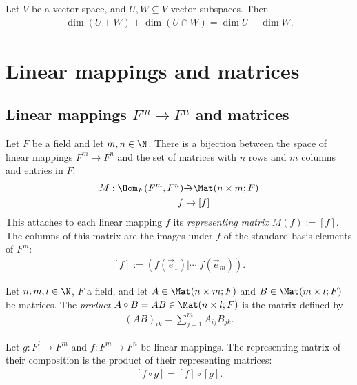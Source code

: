 \documentclass{article}
\begin{document}
\begin{corollary}
    Let $V$ be a vector space, and $U,W\subseteq V$ vector subspaces. Then
    \begin{align*}
        \dim(U+W)+\dim(U\cap W) = \dim U + \dim W.
    \end{align*}
\end{corollary}

\section{Linear mappings and matrices}

\subsection{Linear mappings $F^m\to F^n$ and matrices}

\begin{theorem}[Notes 2.1.1]
    Let $F$ be a field and let $m,n\in\N$. There is a bijection between the space of
    linear mappings $F^m\to F^n$ and the set of matrices with $n$ rows and $m$
    columns and entries in $F$:
    \begin{align*}
        M:\Hom_F(F^m,F^n) & \tilde\to\Mat(n\times m; F) \\
        f                 & \mapsto  \left[f\right]
    \end{align*}
    This attaches to each linear mapping $f$ its \emph{representing matrix
        $M(f):=\left[f\right]$}. The columns of this matrix are the images under $f$
    of the standard basis elements of $F^m$:
    \begin{align*}
        \left[f\right]:=(f(\vec e_1)|\cdots|f(\vec e_m)).
    \end{align*}
\end{theorem}

\begin{definition}
    Let $n,m,l\in\N$, $F$ a field, and let $A\in\Mat(n\times m; F)$ and
    $B\in\Mat(m\times l; F)$ be matrices. The \emph{product}
    $A\circ B=AB\in\Mat(n\times l; F)$ is the matrix defined by
    \begin{align*}
        (AB)_{ik} = \sum_{j=1}^m A_{ij}B_{jk}.
    \end{align*}
\end{definition}

\begin{theorem}[Notes 2.1.8]
    Let $g:F^l\to F^m$ and $f:F^m\to F^n$ be linear mappings. The representing matrix
    of their composition is the product of their representing matrices:
    \begin{align*}
        \left[f\circ g\right]=\left[f\right]\circ\left[g\right].
    \end{align*}
\end{theorem}
\end{document}
